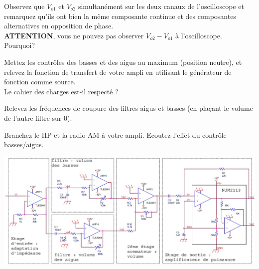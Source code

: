 \documentclass{../template/labo}
\begin{document}
\Question
{
Observez que $V_{o1}$ et $V_{o2}$ simultanément sur les deux canaux de l'oscilloscope et remarquez qu'ils ont bien la même composante continue et des composantes alternatives en opposition de phase.\\
\textbf{ATTENTION}, vous ne pouvez pas observer $V_{o2} - V_{o1}$ à l'oscilloscope. Pourquoi?
}
{}

\Question
{
Mettez les contrôles des basses et des aigus au maximum (position neutre), et relevez la fonction de transfert de votre ampli en utilisant le générateur de fonction comme source.\\
Le cahier des charges est-il respecté ?
}
{}

\Question
{
Relevez les fréquences de coupure des filtres aigus et basses (en plaçant le volume de l'autre filtre sur $0$).
}
{}

\Question
{
Branchez le HP et la radio AM à votre ampli. Ecoutez l'effet du contrôle basses/aigus.
}
{}

\begin{center}
\includegraphics[width=26cm, angle=90]{figures/AOPmontagetotal}
\end{center}
\end{document}
